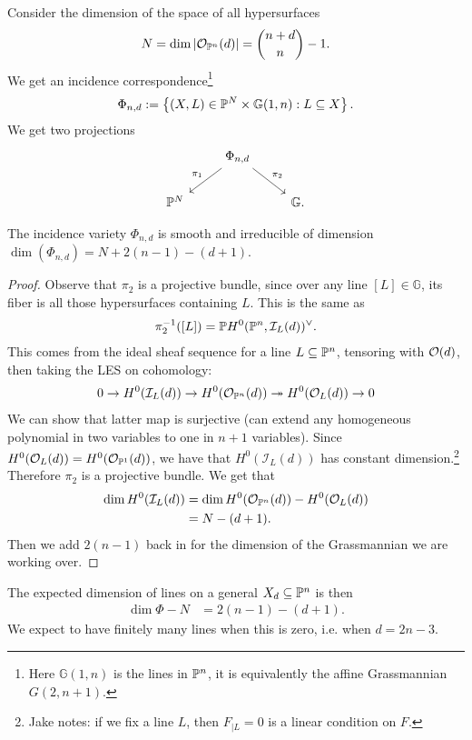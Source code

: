 \documentclass[11pt]{amsart}
\begin{document}
Consider the dimension of the space of all hypersurfaces
\begin{align*}
    N = \dim \left| \O_{\P^n}(d) \right| = \binom{n+d}{n}-1.
\end{align*}
We get an incidence correspondence\footnote{Here $\mathbb{G}(1,n)$ is the lines in $\P^n$, it is equivalently the affine Grassmannian $G(2,n+1)$.}
\begin{align*}
    \Phi_{n,d}:= \left\{ (X,L) \in \P^N \times \mathbb{G}(1,n) : L \subseteq X \right\}.
\end{align*}
We get two projections
\[ \begin{tikzcd}
     & \Phi_{n,d}\ar[dl,"\pi_1" above left]\ar[dr,"\pi_2" above right] & \\
    \mathbb{P}^N &  & \mathbb{G}.
\end{tikzcd} \]
%
\begin{proposition} The incidence variety $\Phi_{n,d}$ is smooth and irreducible of dimension $\dim(\Phi_{n,d}) = N + 2(n-1) - (d+1)$.
\end{proposition}
\begin{proof} Observe that $\pi_2$ is a projective bundle, since over any line $[L] \in \mathbb{G}$, its fiber is all those hypersurfaces containing $L$. This is the same as
\begin{align*}
    \pi_2^{-1}([L]) = \mathbb{P} H^0(\P^n, \mathcal{I}_L(d))^\vee.
\end{align*}
This comes from the ideal sheaf sequence for a line $L \subseteq \P^n$, tensoring with $\O(d)$, then taking the LES on cohomology:
\begin{align*}
    0 \to H^0(\mathcal{I}_L(d)) \to H^0(\O_{\P^n}(d)) \tto H^0(\O_L(d)) \to 0
\end{align*}
We can show that latter map is surjective (can extend any homogeneous polynomial in two variables to one in $n+1$ variables). Since $H^0(\O_L(d)) = H^0(\O_{\P^1}(d))$, we have that $H^0(\mathcal{I}_L(d))$ has constant dimension.\footnote{Jake notes: if we fix a line $L$, then $F_{|L}=0$ is a linear condition on $F$.} Therefore $\pi_2$ is a projective bundle. We get that
\begin{align*}
    \dim H^0(\mathcal{I}_L(d)) &= \dim H^0(\O_{\P^n}(d)) - H^0(\O_L(d)) \\
    &= N - (d+1).
\end{align*}
Then we add $2(n-1)$ back in for the dimension of the Grassmannian we are working over.
\end{proof}

The expected dimension of lines on a general $X_d \subseteq \P^n$ is then
\begin{align*}
    \dim \Phi - N &= 2(n-1) - (d+1).
\end{align*}
%
We expect to have finitely many lines when this is zero, i.e. when $d = 2n-3$.
\end{document}
